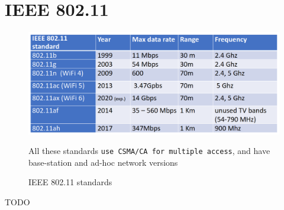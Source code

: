 \chapter{IEEE 802.11}

\begin{figure}[htbp]
   \centering
   \includegraphics{images/ieee_bgn.png}
   \caption{IEEE 802.11 standards}
   \label{fig:ieee_bgn}
   All these standards \texttt{use \texttt{CSMA/CA} for multiple access}, and have base-station and ad-hoc network versions
\end{figure}

TODO